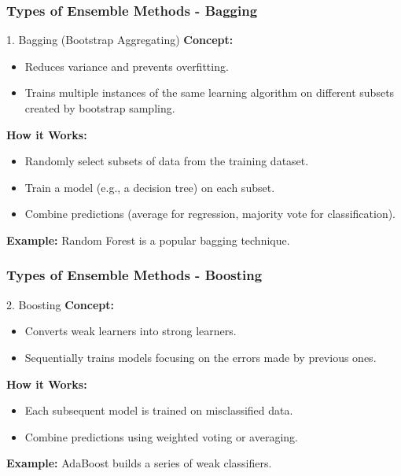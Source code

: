 \documentclass[aspectratio=169]{beamer}
\begin{document}
\begin{frame}[fragile]
    \frametitle{Types of Ensemble Methods - Bagging}
    \begin{block}{1. Bagging (Bootstrap Aggregating)}
        \textbf{Concept:}
        \begin{itemize}
            \item Reduces variance and prevents overfitting.
            \item Trains multiple instances of the same learning algorithm on different subsets created by bootstrap sampling.
        \end{itemize}

        \textbf{How it Works:}
        \begin{itemize}
            \item Randomly select subsets of data from the training dataset.
            \item Train a model (e.g., a decision tree) on each subset.
            \item Combine predictions (average for regression, majority vote for classification).
        \end{itemize}

        \textbf{Example:} Random Forest is a popular bagging technique.
    \end{block}
\end{frame}

\begin{frame}[fragile]
    \frametitle{Types of Ensemble Methods - Boosting}
    \begin{block}{2. Boosting}
        \textbf{Concept:}
        \begin{itemize}
            \item Converts weak learners into strong learners.
            \item Sequentially trains models focusing on the errors made by previous ones.
        \end{itemize}

        \textbf{How it Works:}
        \begin{itemize}
            \item Each subsequent model is trained on misclassified data.
            \item Combine predictions using weighted voting or averaging.
        \end{itemize}
        
        \textbf{Example:} AdaBoost builds a series of weak classifiers.
    \end{block}
\end{frame}
\end{document}
